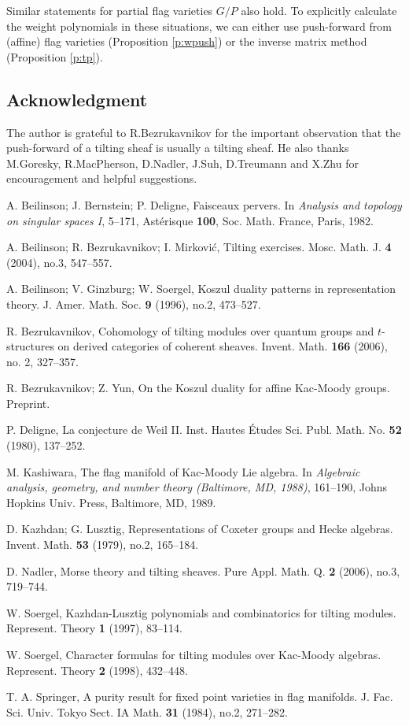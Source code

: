 \documentclass{amsart}
\theoremstyle{plain}
\theoremstyle{definition}
\theoremstyle{remark}
\numberwithin{equation}{subsection}
\begin{document}
Similar statements for partial flag varieties $G/P$ also hold. To explicitly calculate the weight polynomials in these situations, we can either use push-forward from (affine) flag varieties (Proposition \ref{p:wpush}) or the inverse matrix method (Proposition \ref{p:tp}).

\subsection*{Acknowledgment}
The author is grateful to R.Bezrukavnikov for the important observation that the push-forward of a tilting sheaf is usually a tilting sheaf. He also thanks M.Goresky, R.MacPherson, D.Nadler, J.Suh, D.Treumann and X.Zhu for encouragement and helpful suggestions.

\begin{thebibliography}{1}
A. Beilinson; J. Bernstein; P. Deligne, Faisceaux pervers. In \textit{Analysis and topology on singular spaces I}, 5--171, Ast\'erisque \textbf{100}, Soc. Math. France, Paris, 1982.

A. Beilinson; R. Bezrukavnikov; I. Mirkovi\'c, Tilting exercises. Mosc. Math. J. \textbf{4} (2004), no.3, 547--557.

A. Beilinson; V. Ginzburg; W. Soergel, Koszul duality patterns in representation theory.  J. Amer. Math. Soc. \textbf{9} (1996), no.2, 473--527.

R. Bezrukavnikov, Cohomology of tilting modules over quantum groups and $t$-structures on derived categories of coherent sheaves. Invent. Math. \textbf{166} (2006), no. 2, 327--357.

R. Bezrukavnikov; Z. Yun, On the Koszul duality for affine Kac-Moody groups. Preprint.

P. Deligne, La conjecture de Weil II. Inst. Hautes \'Etudes Sci. Publ. Math. No. \textbf{52} (1980), 137--252.

M. Kashiwara, The flag manifold of Kac-Moody Lie algebra. In \textit{Algebraic analysis, geometry, and number theory (Baltimore, MD, 1988)}, 161--190, Johns Hopkins Univ. Press, Baltimore, MD, 1989.

D. Kazhdan; G. Lusztig, Representations of Coxeter groups and Hecke algebras. Invent. Math. \textbf{53} (1979), no.2, 165--184. 

D. Nadler, Morse theory and tilting sheaves. Pure Appl. Math. Q. \textbf{2} (2006), no.3, 719--744.

W. Soergel, Kazhdan-Lusztig polynomials and combinatorics for tilting modules.  Represent. Theory \textbf{1} (1997), 83--114.

W. Soergel, Character formulas for tilting modules over Kac-Moody algebras.  Represent. Theory \textbf{2} (1998), 432--448.

T. A. Springer, A purity result for fixed point varieties in flag manifolds. J. Fac. Sci. Univ. Tokyo Sect. IA Math. \textbf{31} (1984), no.2, 271--282.

\end{thebibliography}
\end{document}
